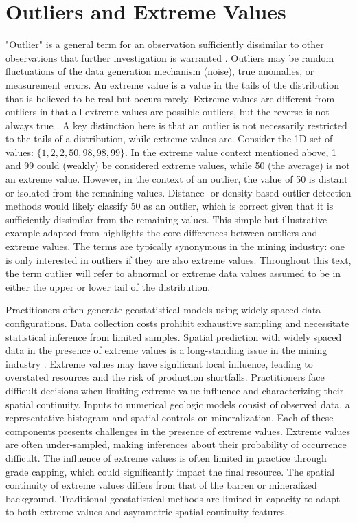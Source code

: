 \FloatBarrier
\section{Outliers and Extreme Values}
\label{sec:02extreme}

"Outlier" is a general term for an observation sufficiently dissimilar to other observations that further investigation is warranted \citep{barnett1984outliers}. Outliers may be random fluctuations of the data generation mechanism (noise), true anomalies, or measurement errors. An extreme value is a value in the tails of the distribution that is believed to be real but occurs rarely. Extreme values are different from outliers in that all extreme values are possible outliers, but the reverse is not always true \citep{aggarwal2016outlier}. A key distinction here is that an outlier is not necessarily restricted to the tails of a distribution, while extreme values are. Consider the \gls{1D} set of values: $\{1,2,2,50,98,98,99\}$. In the extreme value context mentioned above, 1 and 99 could (weakly) be considered extreme values, while 50 (the average) is not an extreme value. However, in the context of an outlier, the value of 50 is distant or isolated from the remaining values. Distance- or density-based outlier detection methods would likely classify 50 as an outlier, which is correct given that it is sufficiently dissimilar from the remaining values. This simple but illustrative example adapted from \cite{aggarwal2016outlier} highlights the core differences between outliers and extreme values. The terms are typically synonymous in the mining industry: one is only interested in outliers if they are also extreme values. Throughout this text, the term outlier will refer to abnormal or extreme data values assumed to be in either the upper or lower tail of the distribution.

Practitioners often generate geostatistical models using widely spaced data configurations. Data collection costs prohibit exhaustive sampling and necessitate statistical inference from limited samples. Spatial prediction with widely spaced data in the presence of extreme values is a long-standing issue in the mining industry \citep{leuangthong2015dealing}. Extreme values may have significant local influence, leading to overstated resources and the risk of production shortfalls. Practitioners face difficult decisions when limiting extreme value influence and characterizing their spatial continuity. Inputs to numerical geologic models consist of observed data, a representative histogram and spatial controls on mineralization. Each of these components presents challenges in the presence of extreme values. Extreme values are often under-sampled, making inferences about their probability of occurrence difficult. The influence of extreme values is often limited in practice through grade capping, which could significantly impact the final resource. The spatial continuity of extreme values differs from that of the barren or mineralized background. Traditional geostatistical methods are limited in capacity to adapt to both extreme values and asymmetric spatial continuity features.

